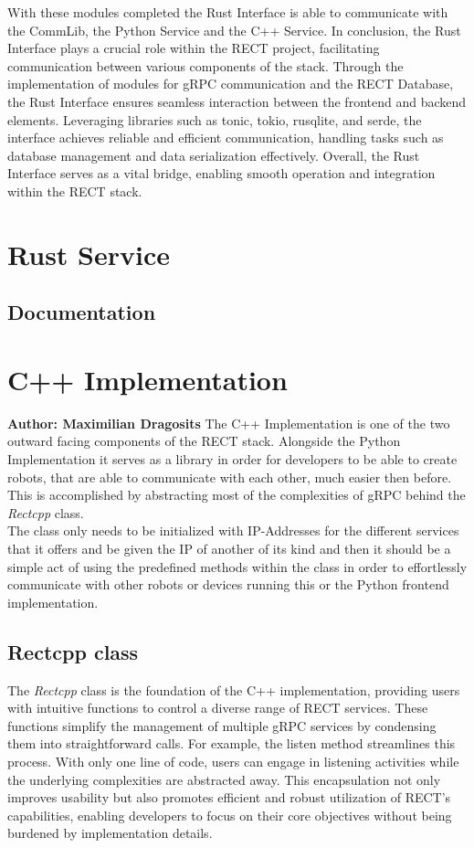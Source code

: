 With these modules completed the Rust Interface is able to communicate with the CommLib, the Python Service and the C++ Service. In conclusion, the Rust Interface plays a 
crucial role within the RECT project, facilitating communication between various components of the stack. Through the implementation of modules for gRPC communication and 
the RECT Database, the Rust Interface ensures seamless interaction between the frontend and backend elements. Leveraging libraries such as tonic, tokio, rusqlite, and 
serde, the interface achieves reliable and efficient communication, handling tasks such as database management and data serialization effectively. Overall, the Rust 
Interface serves as a vital bridge, enabling smooth operation and integration within the RECT stack.

\section{Rust Service}
\subsection{Documentation}

\section{C++ Implementation}
\textbf{Author: Maximilian Dragosits}
The C++ Implementation is one of the two outward facing components of the RECT stack. Alongside the Python Implementation 
it serves as a library in order for developers to be able to create robots, that are able to communicate with each other, much
easier then before. This is accomplished by abstracting most of the complexities of gRPC behind the \textit{Rectcpp} class. \\

The class only needs to be initialized with IP-Addresses for the different services that it offers and be given the IP of 
another of its kind and then it should be a simple act of using the predefined methods within the class in order to 
effortlessly communicate with other robots or devices running this or the Python frontend implementation.

\subsection{Rectcpp class}
The \textit{Rectcpp} class is the foundation of the C++ implementation, providing users with intuitive functions to control a diverse range of RECT services. 
These functions simplify the management of multiple gRPC services by condensing them into straightforward calls. For example, the listen method streamlines 
this process. With only one line of code, users can engage in listening activities while the underlying complexities are abstracted away. This encapsulation 
not only improves usability but also promotes efficient and robust utilization of RECT's capabilities, enabling developers to focus on their core objectives 
without being burdened by implementation details.

